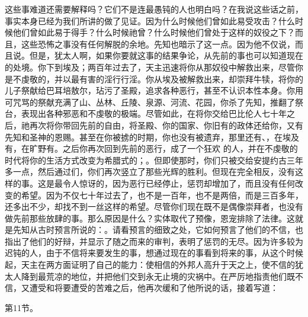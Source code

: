 这些事难道还需要解释吗？它们不是连最愚钝的人也明白吗？在我说这些话之前，事实本身已经为我们所讲的做了见证。因为什么时候他们曾如此易受攻击？什么时候他们曾如此易于得手？什么时候祂曾？什么时候他们曾处于这样的奴役之下？而且，这些恐怖之事没有任何解脱的余地。先知也暗示了这一点。因为他不仅说，而且说。但是，犹太人啊，如果你要就这事的结果争论，从先前的事也可以知道现在的处境。你下到埃及；两百年过去了，天主迅速将你从那奴役中解救出来，尽管你是不虔敬的，并以最有害的淫行行淫。你从埃及被解救出来，却崇拜牛犊，将你的儿子祭献给巴耳培敖尔，玷污了圣殿，追求各种恶行，甚至不认识本性本身。你用可咒骂的祭献充满了山、丛林、丘陵、泉源、河流、花园，你杀了先知，推翻了祭台，表现出各种邪恶和不虔敬的极端。尽管如此，在将你交给巴比伦人七十年之后，祂再次将你带回先前的自由，将圣殿、你的国家、你旧有的政体还给你，又有先知和圣神的恩赐。甚至在你被掳的时期，你也没有被遗弃，那里还有、，在埃及有，在旷野有。之后你再次回到先前的恶行，成了一个狂欢 的人，并在不虔敬的时代将你的生活方式改变为希腊式的；。但即使那时，你们只被交给安提约古三年多一点，然后通过们，你们再次竖立了那些光辉的胜利。但现在完全相反，没有这样的事。这是最令人惊讶的，因为恶行已经停止，惩罚却增加了，而且没有任何改变的希望。因为不仅七十年过去了，也不是一百年，也不是两倍，而是三百多年，还多出不少，却找不到一丝这样的希望。尽管你们现在既不是偶像崇拜者，也没有做先前那些放肆的事。那么原因是什么？实体取代了预像，恩宠排除了法律。这就是先知从古时预言所说的：。请看预言的细致之处，它如何预言了他们的不信，也指出了他们的好辩，并显示了随之而来的审判，表明了惩罚的无尽。因为许多较为迟钝的人，由于不信将来要发生的事，想通过现在的事看到将来的事，从这个时候起，天主在两方面证明了自己的能力：使相信的外邦人高升于天之上，使不信的犹太人降到最荒凉的地位，并把他们交到永无止境的灾祸中。在严厉地指责他们既不信，又遭受和将要遭受的苦难之后，他再次缓和了他所说的话，接着写道：\par

第11节。\par

